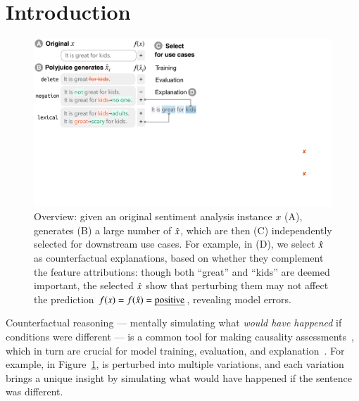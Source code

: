 \section{Introduction}
\label{sec:intro}


\begin{figure}[t]
\centering
\includegraphics[trim={0 18cm 30.5cm 0cm},clip, width=1\columnwidth]{figures/teaser.pdf}
\vspace{-15pt}
\caption{
Overview: given an original sentiment analysis instance $x$ (A), \sysname generates (B) a large number of $\hat{x}$, which are then (C) independently selected for downstream use cases.
For example, in (D), we select $\hat{x}$ as counterfactual explanations, based on whether they complement the feature attributions: though both ``great'' and ``kids'' are deemed important, the selected $\hat{x}$ show that perturbing them may not affect the prediction $f(x)=f(\hat{x})=\text{\emph{positive}}$, revealing model errors.
}
\vspace{-15pt}
\label{fig:teaser}
\end{figure} 
 

Counterfactual reasoning --- mentally simulating what \emph{would have happened} if conditions were different --- is a common tool for making causality assessments~\cite{kahneman}, which in turn are crucial for model training, evaluation, and explanation~\cite{miller}. 
For example, in Figure~\ref{fig:teaser},  is perturbed into multiple variations, and each variation brings a unique insight by simulating what would have happened if the sentence was different.

